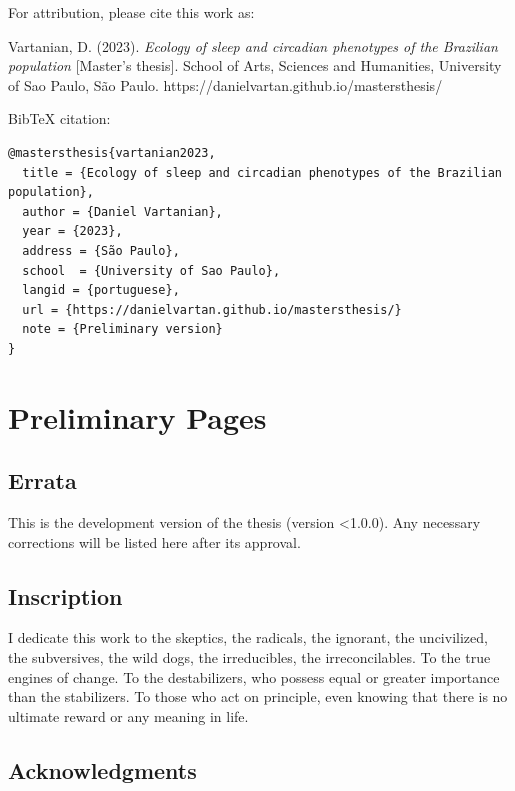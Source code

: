 \documentclass[
  12pt,
  a4paper,
  oneside]{tesesusp}
\begin{document}

For attribution, please cite this work as:

Vartanian, D. (2023). \emph{Ecology of sleep and circadian phenotypes of
the Brazilian population} {[}Master's thesis{]}. School of Arts,
Sciences and Humanities, University of Sao Paulo, São Paulo.
https://danielvartan.github.io/mastersthesis/

BibTeX citation:

\begin{verbatim}
@mastersthesis{vartanian2023,
  title = {Ecology of sleep and circadian phenotypes of the Brazilian population},
  author = {Daniel Vartanian},
  year = {2023},
  address = {São Paulo},
  school  = {University of Sao Paulo},
  langid = {portuguese},
  url = {https://danielvartan.github.io/mastersthesis/}
  note = {Preliminary version}
}
\end{verbatim}

\part{Preliminary Pages}

\hypertarget{errata}{%
\chapter*{Errata}\label{errata}}


This is the development version of the thesis (version \textless1.0.0).
Any necessary corrections will be listed here after its approval.

\hypertarget{inscription}{%
\chapter*{Inscription}\label{inscription}}


I dedicate this work to the skeptics, the radicals, the ignorant, the
uncivilized, the subversives, the wild dogs, the irreducibles, the
irreconcilables. To the true engines of change. To the destabilizers,
who possess equal or greater importance than the stabilizers. To those
who act on principle, even knowing that there is no ultimate reward or
any meaning in life.

\hypertarget{acknowledgments}{%
\chapter*{Acknowledgments}\label{acknowledgments}}
\end{document}

